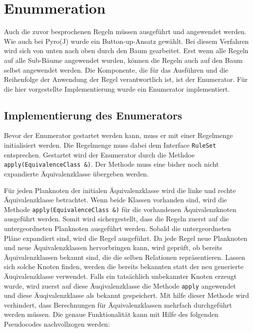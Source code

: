 \section{Enummeration}

Auch die zuvor besprochenen Regeln müssen ausgeführt und angewendet werden. Wie auch bei Pyro(J) wurde ein Button-up-Ansatz gewählt. Bei diesem Verfahren wird sich von unten nach oben durch den Baum gearbeitet. Erst wenn alle Regeln auf alle Sub-Bäume angewendet wurden, können die Regeln auch auf den Baum selbst angewendet werden. Die Komponente, die für das Ausführen und die Reihenfolge der Anwendung der Regel verantwortlich ist, ist der Enumerator. Für die hier vorgestellte Implementierung wurde ein Enumerator implementiert.


\subsection{Implementierung des Enumerators}

Bevor der Enumerator gestartet werden kann, muss er mit einer Regelmenge initialisiert werden. Die Regelmenge muss dabei dem Interface \texttt{RuleSet} entsprechen. Gestartet wird der Enumerator durch die Methdoe \texttt{apply(EquivalenceClass \&)}. Der Methode muss eine bisher noch nicht expandierte Äquivalenzklasse übergeben werden. 

Für jeden Planknoten der initialen Äquivalenzklasse wird die linke und rechte Äquivalenzklasse betrachtet. Wenn beide Klassen vorhanden sind, wird die Methode \texttt{apply(EquivalenceClass \&)} für die vorhandenen Äquivalenzknoten ausgeführt werden. Somit wird sichergestellt, dass die Regeln zuerst auf die untergeordneten Planknoten ausgeführt werden. Sobald die untergeordneten Pläne expandiert sind, wird die Regel ausgeführt. Da jede Regel neue Planknoten und neue Äquivalenzklassen hervorbringen kann, wird geprüft, ob bereits Äquivalenzklassen bekannt sind, die die selben Relationen repräsentieren. Lassen sich solche Knoten finden, werden die bereits bekannten statt der neu generierte Äuqivalenzklasse verwendet. Falls ein tatsächlich unbekannter Knoten erzeugt wurde, wird zuerst auf diese Äuqivalenzklasse die Methode \texttt{apply} angewendet und diese Äuqivalenzklasse als bekannt gespeichert. Mit hilfe dieser Methode wird verhindert, dass Berechnungen für Äquivalenzklassen mehrfach durchgeführt werden müssen. Die genaue Funktionalität kann mit Hilfe des folgenden Pseudocodes nachvollzogen werden:



